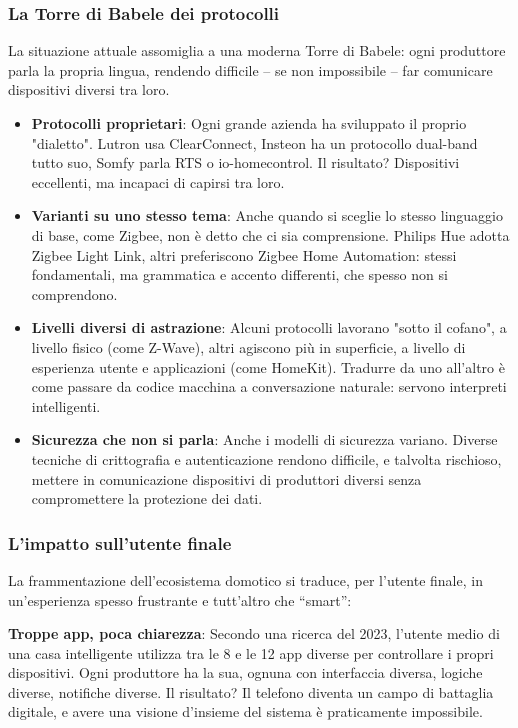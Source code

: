 \subsubsection{La Torre di Babele dei protocolli}
La situazione attuale assomiglia a una moderna Torre di Babele: ogni produttore parla la propria lingua, rendendo difficile – se non impossibile – far comunicare dispositivi diversi tra loro.

\begin{itemize}
\item \textbf{Protocolli proprietari}: Ogni grande azienda ha sviluppato il proprio "dialetto". Lutron usa ClearConnect, Insteon ha un protocollo dual-band tutto suo, Somfy parla RTS o io-homecontrol. Il risultato? Dispositivi eccellenti, ma incapaci di capirsi tra loro.

\item \textbf{Varianti su uno stesso tema}: Anche quando si sceglie lo stesso linguaggio di base, come Zigbee, non è detto che ci sia comprensione. Philips Hue adotta Zigbee Light Link, altri preferiscono Zigbee Home Automation: stessi fondamentali, ma grammatica e accento differenti, che spesso non si comprendono.

\item \textbf{Livelli diversi di astrazione}: Alcuni protocolli lavorano "sotto il cofano", a livello fisico (come Z-Wave), altri agiscono più in superficie, a livello di esperienza utente e applicazioni (come HomeKit). Tradurre da uno all’altro è come passare da codice macchina a conversazione naturale: servono interpreti intelligenti.

\item \textbf{Sicurezza che non si parla}: Anche i modelli di sicurezza variano. Diverse tecniche di crittografia e autenticazione rendono difficile, e talvolta rischioso, mettere in comunicazione dispositivi di produttori diversi senza compromettere la protezione dei dati.
\end{itemize}

\subsubsection{L'impatto sull'utente finale}

La frammentazione dell’ecosistema domotico si traduce, per l’utente finale, in un’esperienza spesso frustrante e tutt’altro che “smart”:

\textbf{Troppe app, poca chiarezza}: Secondo una ricerca del 2023, l’utente medio di una casa intelligente utilizza tra le 8 e le 12 app diverse per controllare i propri dispositivi. Ogni produttore ha la sua, ognuna con interfaccia diversa, logiche diverse, notifiche diverse. Il risultato? Il telefono diventa un campo di battaglia digitale, e avere una visione d’insieme del sistema è praticamente impossibile.

